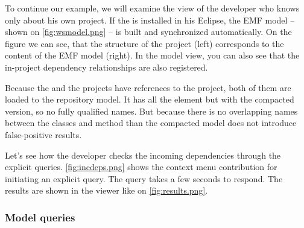 To continue our example, we will examine the view of the developer who knows
only about his own  project. If the \ptool{} is  installed in his
Eclipse, the EMF model -- shown on \autoref{fig:wsmodel.png}
-- is built and synchronized automatically. On the figure we can see, that the
structure of the project (left) corresponds to the content of the EMF model
(right). In the model view, you can also see that the in-project dependency
relationships are also registered.


Because the  and the  projects have references to the
 project, both of them are loaded to the repository model. It has all the
element but with the compacted version, so no fully qualified names. But because
there is no overlapping names between the classes and method than the compacted
model does not introduce false-positive results.

Let's see how the developer checks the incoming dependencies through the
explicit queries.
\autoref{fig:incdeps.png} shows the context menu contribution for initiating an
explicit query. The query takes a few seconds to respond. The results are shown
in the viewer like on \autoref{fig:results.png}.
 
\subsubsection{Model queries}

